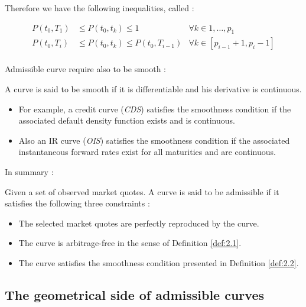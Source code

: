 Therefore we have  the following inequalities, called  :
\label{arbtr-free-inq}

\begin{center}
  \begin{align*}
    P(t_0,T_1) & \leq P(t_0,t_k) \leq 1 & \forall k \in 1,\dots,p_1 \\
    P(t_0,T_i) &\leq P(t_0,t_k) \leq P(t_0,T_{i-1}) & \forall k \in [p_{i-1}+1
    , p_i-1 ]\\
  \end{align*}
\end{center}

Admissible curve require also to be smooth :
\begin{de}
  \label{def:2.2}
  A curve  is said to be  smooth if it  is differentiable and his  derivative is
  continuous.
\end{de}


\begin{rem}
  \begin{itemize}
  \item For example,  a credit  curve (\textit{CDS})  satisfies the  smoothness condition  if the
    associated default density function exists and is continuous.\\
  \item Also  an IR  curve  (\textit{OIS})  satisfies the  smoothness  condition if  the
    associated  instantaneous  forward  rates  exist  for  all  maturities  and  are
    continuous.
  \end{itemize}
\end{rem}

\sautb
In summary :
\begin{de}
  Given a set of observed market quotes. A  curve is said to be admissible if it
  satisfies the following three constraints :
  \begin{itemize}
  \item The selected market quotes are perfectly reproduced by the curve.
  \item The curve is arbitrage-free in the sense of Definition \ref{def:2.1}.
  \item The curve satisfies the smoothness condition presented in Definition 
    \ref{def:2.2}.
  \end{itemize}
\end{de}

\subsection{The geometrical side of admissible curves}
\label{sec:geom-side-admiss}

